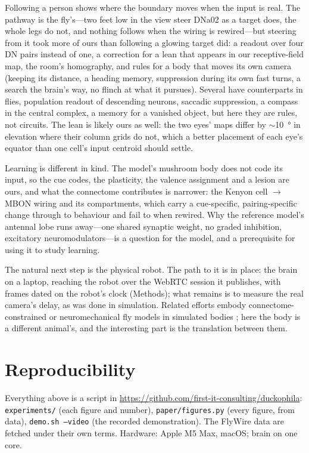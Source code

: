 \documentclass[10pt,a4paper]{article}
\begin{document}
Following a person shows where the boundary moves when the input is real. The pathway is the
fly's---two feet low in the view steer DNa02 as a target does, the whole legs do not, and nothing
follows when the wiring is rewired---but steering from it took more of ours than following a glowing
target did: a readout over four DN pairs instead of one, a correction for a lean that appears in our
receptive-field map, the room's homography, and rules for a body that moves its own camera (keeping its distance, a heading
memory, suppression during its own fast turns, a search the brain's way, no flinch at what it pursues).
Several have counterparts in flies, population readout of descending neurons, saccadic suppression, a
compass in the central complex, a memory for a vanished object,
but here they are rules, not circuits. The lean is likely ours as well: the two eyes' maps differ by
$\sim$\SI{10}{\degree} in elevation where their column grids do not, which a better placement of each eye's
equator than one cell's input centroid should settle.

Learning is different in kind. The model's mushroom body does not code its input, so the cue codes,
the plasticity, the valence assignment and a lesion are ours, and what the connectome contributes is
narrower: the Kenyon cell $\rightarrow$ MBON wiring and its compartments, which carry a cue-specific,
pairing-specific change through to behaviour and fail to when rewired. Why the reference model's
antennal lobe runs away---one shared synaptic weight, no graded inhibition, excitatory
neuromodulators---is a question for the model, and a prerequisite for using it to study learning.

The natural next step is the physical robot. The path to it is in place: the brain on a laptop,
reaching the robot over the WebRTC session it publishes, with frames dated on the robot's clock
(Methods); what remains is to measure the real camera's delay, as was done in simulation. Related efforts embody
connectome-constrained or neuromechanical fly models in simulated bodies \cite{lobato2022,vaxenburg2025};
here the body is a different animal's, and the interesting part is the translation between them.

\section*{Reproducibility}

Everything above is a script in \url{https://github.com/first-it-consulting/duckophila}:
\texttt{experiments/} (each figure and number), \texttt{paper/figures.py} (every figure, from data),
\texttt{demo.sh --video} (the recorded demonstration). The FlyWire data are fetched under their own terms.
Hardware: Apple M5 Max, macOS; brain on one core.
\end{document}
